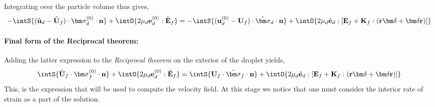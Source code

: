Integrating over the particle volume thus gives, 
\begin{equation*}
    - \intS{
         (\hat{\textbf{u}}_d - \hat{\textbf{U}}_f) \cdot \bm\sigma_d^{(0)}  \cdot \textbf{n}
    }
    + \intO{2\mu_d \textbf{e}_d^{(0)} : \hat{\textbf{E}}_f}
    = 
    - \intS{
     (\textbf{u}_d^{(0)} - \textbf{U}_f)\cdot \hat{\bm\sigma}_d \cdot \textbf{n}
    }
    +\intO{ 2\mu_d \hat{\textbf{e}}_d : [ \textbf{E}_f + \textbf{K}_f : (\textbf{r} \bm\delta + \bm\delta \textbf{r})] }
\end{equation*}

\paragraph*{Final form of the Reciprocal theorem: }
Adding the latter expression to the \textit{Reciprocal theorem} on the exterior of the droplet yields, 
\begin{equation*}
    \intS{\hat{\textbf{U}}_f\cdot  \bm\sigma_f^{(0)} \cdot \textbf{n}}
    + \intO{2\mu_d \textbf{e}_d^{(0)} : \hat{\textbf{E}}_f}
    = 
    \intS{\textbf{U}_f\cdot  \hat{\bm\sigma}_f \cdot \textbf{n}}
    +\intO{ 2\mu_d \hat{\textbf{e}}_d : [ \textbf{E}_f + \textbf{K}_f : (\textbf{r} \bm\delta + \bm\delta \textbf{r})] }
\end{equation*}
This, is the expression that will be used to compute the velocity field. 
At this stage we notice that one must consider the interior rate of strain as a part of the solution. 

